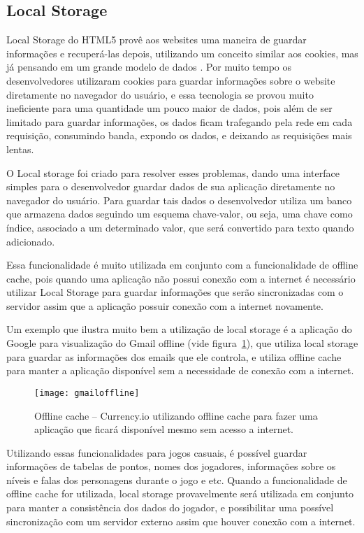 \subsection{Local Storage}

Local Storage do HTML5 provê aos websites uma maneira de guardar
informações e recuperá-las depois, utilizando um conceito similar aos
cookies, mas já pensando em um grande modelo de dados \cite{pilgrim2010html5}.
Por muito tempo os desenvolvedores utilizaram cookies para guardar
informações sobre o website diretamente no navegador do usuário, e
essa tecnologia se provou muito ineficiente para uma quantidade um
pouco maior de dados, pois além de ser limitado para guardar informações,
os dados ficam trafegando pela rede em cada requisição, consumindo
banda, expondo os dados, e deixando as requisições mais lentas.

O Local storage foi criado para resolver esses problemas, dando uma
interface simples para o desenvolvedor guardar dados de sua
aplicação diretamente no navegador do usuário. Para guardar tais dados
o desenvolvedor utiliza um banco que armazena dados seguindo um
esquema chave-valor, ou seja, uma chave como índice, associado a um
determinado valor, que será convertido para texto quando adicionado.

Essa funcionalidade é muito utilizada em conjunto com a funcionalidade
de offline cache, pois quando uma aplicação não possui conexão com a
internet é necessário utilizar Local Storage para guardar informações
que serão sincronizadas com o servidor assim que a aplicação possuir
conexão com a internet novamente.

Um exemplo que ilustra muito bem a utilização de local storage é a
aplicação do Google para visualização do Gmail offline (vide
figura~\ref{img:gmailoffline}), que utiliza local storage para guardar
as informações dos emails que ele controla, e utiliza offline cache
para manter a aplicação disponível sem a necessidade de conexão com a
internet.

\begin{figure}[H]
  \centering
	\texttt{[image: gmailoffline]}
  \caption{Offline cache {--} Currency.io utilizando offline cache
  para fazer uma aplicação que ficará disponível mesmo sem acesso a
  internet.}
  \label{img:gmailoffline}
\end{figure}

Utilizando essas funcionalidades para jogos casuais, é possível
guardar informações de tabelas de pontos, nomes dos jogadores,
informações sobre os níveis e falas dos personagens durante o jogo e
etc. Quando a funcionalidade de offline cache for utilizada, local
storage provavelmente será utilizada em conjunto para manter a
consistência dos dados do jogador, e possibilitar uma possível
sincronização com um servidor externo assim que houver conexão com a
internet.

